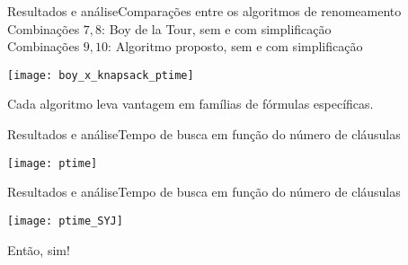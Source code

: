 \begin{frame}{Resultados e análise}{Comparações entre os algoritmos de renomeamento}
	Combinações $7,8$: Boy de la Tour, sem e com simplificação\\
	Combinações $9,10$: Algoritmo proposto, sem e com simplificação
	
	\vspace{-.4cm}
	\pause
	\begin{center}
		\texttt{[image: boy\_x\_knapsack\_ptime]}
	\end{center}
	
	\vspace{-.6cm}
	\pause Cada algoritmo leva vantagem em famílias de fórmulas específicas.
\end{frame}

\begin{frame}{Resultados e análise}{Tempo de busca em função do número de cláusulas}
	\begin{center}
		\texttt{[image: ptime]}
	\end{center}
\end{frame}

\begin{frame}{Resultados e análise}{Tempo de busca em função do número de cláusulas}
	\begin{center}
		\texttt{[image: ptime\_SYJ]}
	\end{center}
	
	\pause Então, sim!
\end{frame}
